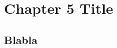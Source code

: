 
\chapter{Chapter 5 Title}
\label{chapter:5}
\minitoc
\newpage
\graphicspath{{2-Chapters/5-Chapter/Images/}}

\section{Blabla}
\label{sec:blabla}

